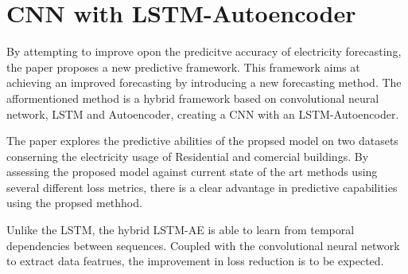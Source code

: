 
\section{CNN with LSTM-Autoencoder}

By attempting to improve opon the predicitve accuracy of electricity forecasting,
the paper \cite{Khan2020} proposes a new predictive framework.
This framework aims at achieving an improved forecasting by introducing a new forecasting method.
The afformentioned method is a hybrid framework based on convolutional neural network, LSTM and Autoencoder,
creating a CNN with an LSTM-Autoencoder.

The paper explores the predictive abilities of the propsed model on two datasets conserning the electricity usage of Residential and comercial buildings.
By assessing the proposed model against current state of the art methods using several different loss metrics,
there is a clear advantage in predictive capabilities using the propsed methhod.

Unlike the LSTM, the hybrid LSTM-AE is able to learn from temporal dependencies between sequences.
Coupled with the convolutional neural network to extract data featrues, the improvement in loss reduction is to be expected.


